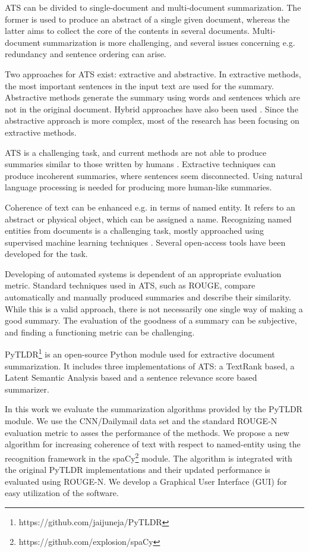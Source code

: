 \documentclass[conference]{IEEEtran}
\begin{document}
ATS can be divided to single-document and multi-document summarization. The former is used to produce an abstract of a single given document, whereas the latter aims to collect the core of the contents in several documents. Multi-document summarization is more challenging, and several issues concerning e.g. redundancy and sentence ordering can arise.

Two approaches for ATS exist: extractive and abstractive. In extractive methods, the most important sentences in the input text are used for the summary. Abstractive methods generate the summary using words and sentences which are not in the original document. 
Hybrid approaches have also been used \cite{el-kassas2020}. Since the abstractive approach is more complex, most of the research has been focusing on extractive methods.

ATS is a challenging task, and current methods are not able to produce summaries similar to those written by humans \cite{el-kassas2020}. Extractive techniques can produce incoherent summaries, where sentences seem disconnected. Using natural language processing is needed for producing more human-like summaries.

Coherence of text can be enhanced e.g. in terms of named entity. It refers to an abstract or physical object, which can be assigned a name. Recognizing named entities from documents is a challenging task, mostly approached using supervised machine learning techniques \cite{jiang2016}. Several open-access tools have been developed for the task.

Developing of automated systems is dependent of an appropriate evaluation metric. Standard techniques used in ATS, such as ROUGE, compare automatically and manually produced summaries and describe their similarity. While this is a valid approach, there is not necessarily one single way of making a good summary. The evaluation of the goodness of a summary can be subjective, and finding a functioning metric can be challenging.

PyTLDR\footnote{https://github.com/jaijuneja/PyTLDR} is an open-source Python module used for extractive document summarization. It includes three implementations of ATS: a TextRank based, a Latent Semantic Analysis based and a sentence relevance score based summarizer. 

In this work we evaluate the summarization algorithms provided by the PyTLDR module. We use the CNN/Dailymail data set and the standard ROUGE-N evaluation metric to asses the performance of the methods. We propose a new algorithm for increasing coherence of text with respect to named-entity using the recognition framework in the spaCy\footnote{https://github.com/explosion/spaCy} module. The algorithm is integrated with the original PyTLDR implementations and their updated performance is evaluated using ROUGE-N. We develop a Graphical User Interface (GUI) for easy utilization of the software.
\end{document}
